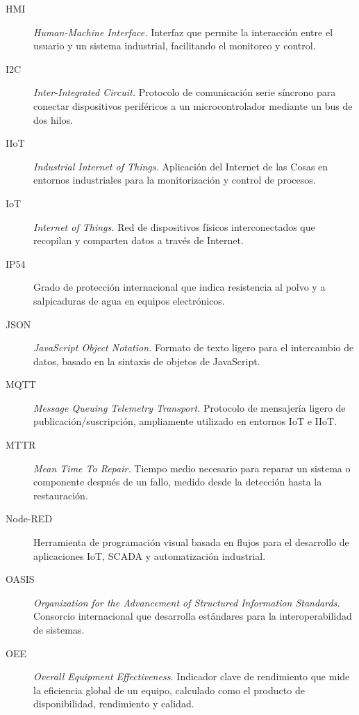 \begin{description}
  \item[HMI] \textit{Human-Machine Interface.} Interfaz que permite la interacción entre el usuario y un sistema industrial, facilitando el monitoreo y control.
  
  \item[I2C] \textit{Inter-Integrated Circuit.} Protocolo de comunicación serie síncrono para conectar dispositivos periféricos a un microcontrolador mediante un bus de dos hilos.
  
  \item[IIoT] \textit{Industrial Internet of Things.} Aplicación del Internet de las Cosas en entornos industriales para la monitorización y control de procesos.
  
  \item[IoT] \textit{Internet of Things.} Red de dispositivos físicos interconectados que recopilan y comparten datos a través de Internet.
  
  \item[IP54] Grado de protección internacional que indica resistencia al polvo y a salpicaduras de agua en equipos electrónicos.
  
  \item[JSON] \textit{JavaScript Object Notation.} Formato de texto ligero para el intercambio de datos, basado en la sintaxis de objetos de JavaScript.
  
  \item[MQTT] \textit{Message Queuing Telemetry Transport.} Protocolo de mensajería ligero de publicación/suscripción, ampliamente utilizado en entornos IoT e IIoT.
  
  \item[MTTR] \textit{Mean Time To Repair.} Tiempo medio necesario para reparar un sistema o componente después de un fallo, medido desde la detección hasta la restauración.
  
  \item[Node-RED] Herramienta de programación visual basada en flujos para el desarrollo de aplicaciones IoT, SCADA y automatización industrial.
  
  \item[OASIS] \textit{Organization for the Advancement of Structured Information Standards.} Consorcio internacional que desarrolla estándares para la interoperabilidad de sistemas.
  
  \item[OEE] \textit{Overall Equipment Effectiveness.} Indicador clave de rendimiento que mide la eficiencia global de un equipo, calculado como el producto de disponibilidad, rendimiento y calidad.
  

\end{description}
